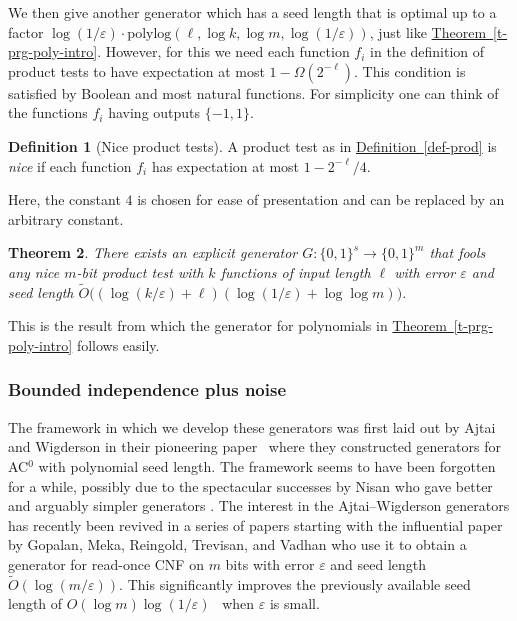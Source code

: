 \documentclass[11pt]{article}
\numberwithin{equation}{section}
\newtheorem{theorem}{Theorem}[section]
\theoremstyle{definition}
\newtheorem{definition}[theorem]{Definition}
\theoremstyle{plain}
\newcommand{\expref}[2]{\hyperref[#2]{#1~\ref{#2}}}
\newcommand{\zo}{\{0,1\}}
\def\eps{\varepsilon}
\def\pmone{\{-1, 1\}}
\def\Blocklength{\ell}
\def\polylog{\mathrm{polylog}}
\begin{document}
\medskip

We then give another generator which has a seed length that is
optimal up to a factor
%
%
%
$\log(1/\eps) \cdot \polylog(\ell, \log k, \log m, \log(1/\eps))$, 
just like \expref{Theorem}{t-prg-poly-intro}.
However, for this we need each function $f_i$ in the definition of product 
tests to have expectation at most $1 - \Omega(2^{-\Blocklength})$.
This condition is satisfied by Boolean and most natural functions.
For simplicity one can think of the functions $f_i$ having outputs $\pmone$.

\begin{definition}[Nice product tests]
A product test as in \expref{Definition}{def-prod} is \emph{nice} if each
function $f_i$ has expectation at most $1 - 2^{-\Blocklength} / 4$.
\end{definition}

Here, the constant $4$ is chosen for ease of presentation and can
be replaced by %
an  %
arbitrary constant.

\begin{theorem} \label{t-prg-prod-nice}
There exists an explicit generator $G\colon \zo^s \to \zo^m$ that fools
any nice
$m$-bit  %
product test with $k$ functions of input length $\Blocklength$ 
with error $\eps$ and seed length 
$\tilde O \bigl((\log(k/\eps) + \Blocklength)(\log(1/\eps)+\log\log m)\bigr)$.
\end{theorem}

This is the result from which the generator for polynomials in \expref{Theorem}{t-prg-poly-intro} follows easily.

\subsubsection{Bounded independence plus noise}
%
The framework in which we develop these generators was first laid out by
Ajtai and Wigderson in their pioneering
%
paper~\cite{AjtaiW89} where they constructed  %
generators for AC$^0$ with polynomial seed length.  The framework
seems to have been forgotten for a while, possibly due to the spectacular
successes by Nisan who gave better and arguably simpler generators
\cite{Nisan91,Nisan92}.  %
The interest in the Ajtai--Wigderson generators has recently been revived %
in a series of papers starting with the
%
influential paper \cite{GopalanMRTV12}  %
by Gopalan, Meka, Reingold, Trevisan, and Vadhan %
who use it to obtain a generator for
read-once CNF on $m$ bits with error $\eps$ and seed length
$\tilde O(\log(m/\eps))$. This significantly improves
%
the previously available seed length of
$O(\log m) \log(1/\eps)$~\cite{ChariRS00,DeETT10} when $\eps$ is small.
\end{document}
